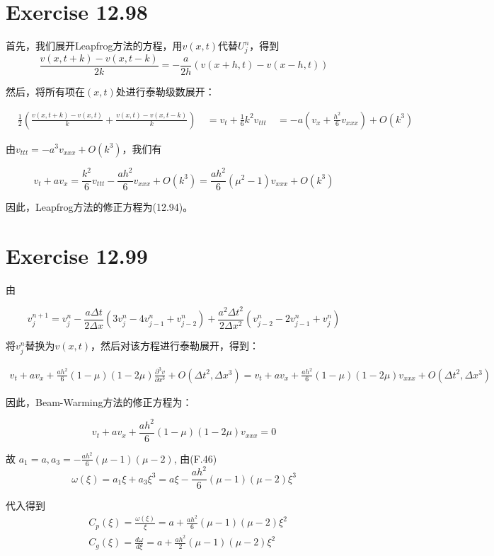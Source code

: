 \documentclass[twoside,a4paper]{article}
\begin{document}
  \section{Exercise 12.98}
  首先，我们展开Leapfrog方法的方程，用$v(x,t)$代替$U^n_j$，得到
$$
\frac{v(x, t+k) - v(x,t - k)}{2k} = -\frac{a}{2h}(v(x+h, t) - v(x-h, t))
$$

然后，将所有项在$(x,t)$处进行泰勒级数展开：

$$
\begin{aligned}
&\frac{1}{2}\left(\frac{v(x, t+k) - v(x, t)}{k} + \frac{v(x,t) - v(x,t - k)}{k}\right) \
&= v_t+\frac{1}{6}k^2v_{ttt}\
&= -a(v_x + \frac{h^2}{6}v_{xxx})+O(k^3)
\end{aligned}
$$

由$v_{ttt} = -a^3v_{xxx} + O(k^3)$，我们有

$$
v_t + av_x = \frac{k^2}{6}v_{ttt} -\frac{ah^2}{6}v_{xxx} + O(k^3) = \frac{ah^2}{6}(\mu^2 - 1)v_{xxx} + O(k^3)
$$

因此，Leapfrog方法的修正方程为(12.94)。


\section{Exercise 12.99}
由

$$
v_j^{n+1} = v_j^n - \frac{a\Delta t}{2\Delta x}(3v_j^n - 4v_{j-1}^n + v_{j-2}^n) + \frac{a^2\Delta t^2}{2\Delta x^2}(v_{j-2}^n - 2v_{j-1}^n + v_j^n)
$$

将$v_j^n$替换为$v(x,t)$，然后对该方程进行泰勒展开，得到：

$$
\begin{aligned}
v_t + av_x + \frac{ah^2}{6}(1-\mu)(1-2\mu)\frac{\partial^3 v}{\partial x^3} + O(\Delta t^2, \Delta x^3)
= v_t + av_x + \frac{ah^2}{6}(1-\mu)(1-2\mu)v_{xxx} + O(\Delta t^2, \Delta x^3)
\end{aligned}
$$

因此，Beam-Warming方法的修正方程为：

$$
v_t + av_x + \frac{ah^2}{6}(1-\mu)(1-2\mu)v_{xxx} = 0
$$

故 $a_1 = a, a_3 = - \frac{ah^2}{6}(\mu-1)(\mu-2)$, 由(F.46)
$$\omega(\xi) = a_1\xi + a_3\xi^3 = a\xi - \frac{ah^2}{6}(\mu-1)(\mu-2)\xi^3$$

代入得到$$\begin{aligned}
  &C_p(\xi) = \frac{\omega(\xi)}{\xi} = a + \frac{ah^2}{6}(\mu-1)(\mu-2)\xi^2\\
  &C_g(\xi) = \frac{d\omega}{d\xi} = a + \frac{ah^2}{2}(\mu-1)(\mu-2)\xi^2
\end{aligned}$$
\end{document}
